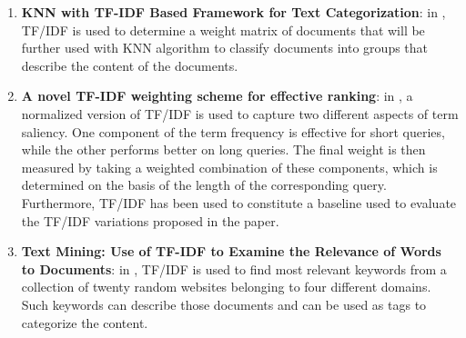 \documentclass[\main/main.tex]{subfiles}
\begin{document}
\begin{enumerate}
    \item \textbf{KNN with TF-IDF Based Framework for Text Categorization}: in \cite{Trstenjak2014KNNWT}, TF/IDF is used to determine a weight matrix of documents that will be further used with KNN algorithm to classify documents into groups that describe the content of the documents.
    \item \textbf{A novel TF-IDF weighting scheme for effective ranking}: in \cite{Paik2013ANT}, a normalized version of TF/IDF is used to capture two different aspects of term saliency. One component of the term frequency is effective for short queries, while the other performs better on long queries. The final weight is then measured by taking a weighted combination of these components, which is determined on the basis of the length of the corresponding query. Furthermore, TF/IDF has been used to constitute a baseline used to evaluate the TF/IDF variations proposed in the paper.
    \item \textbf{Text Mining: Use of TF-IDF to Examine the Relevance of Words to Documents}: in \cite{Qaiser2018TextMU}, TF/IDF is used to find most relevant keywords from a collection of twenty random websites belonging to four different domains. Such keywords can describe those documents and can be used as tags to categorize the content.
\end{enumerate}
\end{document}

